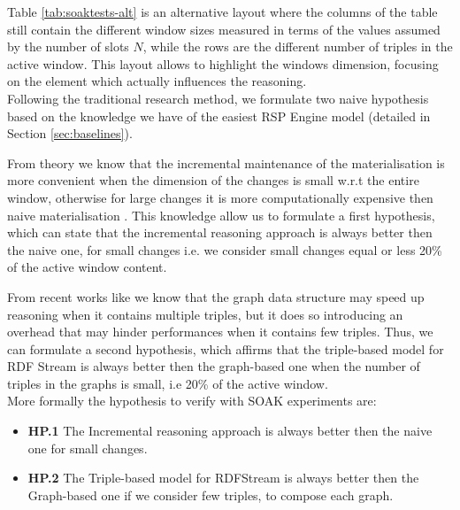 Table \ref{tab:soaktests-alt} is an alternative layout where the columns of the table still contain the different window sizes measured in terms of the values assumed by the number of slots $N$, while the rows are the different number of triples in the active window. This layout allows to highlight the windows dimension, focusing on the element which actually influences the reasoning.\\

\noindent Following the traditional research method, we formulate two naive hypothesis based on the knowledge we have of the easiest RSP Engine model (detailed in Section \ref{sec:baselines}). 

From theory we know that the incremental maintenance of the materialisation is more convenient when the dimension of the changes is small w.r.t the entire window, otherwise  for large changes it is more computationally expensive then  naive materialisation \cite{DellAglio2014,DBLP:conf/cikm/RenP11,DBLP:conf/semweb/UrbaniMJHB13}.
This knowledge allow us to formulate a first hypothesis, which can state that the incremental reasoning approach is always better then the naive one, for small changes i.e. we consider small changes equal or less 20\% of the active window content.

From recent works like \cite{DBLP:conf/semweb/BalduiniVDTPC13} we know that the graph data structure may speed up reasoning when it contains multiple triples, but it does so introducing an overhead that may hinder performances when it contains few triples. Thus, we can formulate a second hypothesis, which affirms that the triple-based model for RDF Stream is always better then the graph-based one when the number of triples in the graphs is small, i.e 20\% of the active window.\\

More formally the hypothesis to verify with SOAK experiments are:
\begin{itemize}
\item \textbf{HP.1} The Incremental reasoning approach is always better then the naive one for small changes.
\item \textbf{HP.2} The Triple-based model for RDFStream is always better then the Graph-based one if we consider few triples, to compose each graph.
\end{itemize}



